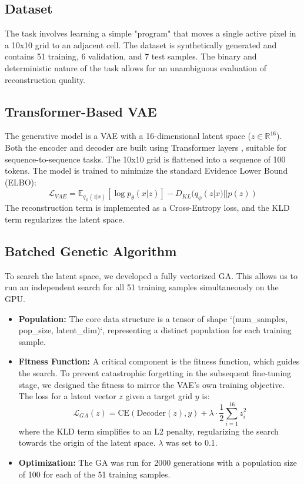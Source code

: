\documentclass[11pt, a4paper, twocolumn]{article}
\begin{document}
\subsection{Dataset}
The task involves learning a simple "program" that moves a single active pixel in a 10x10 grid to an adjacent cell. The dataset is synthetically generated and contains 51 training, 6 validation, and 7 test samples. The binary and deterministic nature of the task allows for an unambiguous evaluation of reconstruction quality.

\subsection{Transformer-Based VAE}
The generative model is a VAE with a 16-dimensional latent space ($z \in \mathbb{R}^{16}$). Both the encoder and decoder are built using Transformer layers \cite{vaswani2017attention}, suitable for sequence-to-sequence tasks. The 10x10 grid is flattened into a sequence of 100 tokens. The model is trained to minimize the standard Evidence Lower Bound (ELBO):
\begin{equation}
    \mathcal{L}_{VAE} = \mathbb{E}_{q_{\phi}(z|x)}[\log p_{\theta}(x|z)] - D_{KL}(q_{\phi}(z|x) || p(z))
\end{equation}
The reconstruction term is implemented as a Cross-Entropy loss, and the KLD term regularizes the latent space.

\subsection{Batched Genetic Algorithm}
To search the latent space, we developed a fully vectorized GA. This allows us to run an independent search for all 51 training samples simultaneously on the GPU.

\begin{itemize}
    \item \textbf{Population:} The core data structure is a tensor of shape `(num_samples, pop_size, latent_dim)`, representing a distinct population for each training sample.
    \item \textbf{Fitness Function:} A critical component is the fitness function, which guides the search. To prevent catastrophic forgetting in the subsequent fine-tuning stage, we designed the fitness to mirror the VAE's own training objective. The loss for a latent vector $z$ given a target grid $y$ is:
    \begin{equation}
        \mathcal{L}_{GA}(z) = \text{CE}(\text{Decoder}(z), y) + \lambda \cdot \frac{1}{2}\sum_{i=1}^{16} z_i^2
    \end{equation}
    where the KLD term simplifies to an L2 penalty, regularizing the search towards the origin of the latent space. $\lambda$ was set to 0.1.
    \item \textbf{Optimization:} The GA was run for 2000 generations with a population size of 100 for each of the 51 training samples.
\end{itemize}
\end{document}
